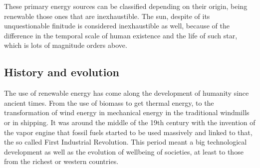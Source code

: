
These primary energy sources can be classified depending on their origin, being renewable those ones that are inexhaustible. The sun, despite of its unquestionable finitude is considered inexhaustible as well, because of the difference in the temporal scale of  human existence and the life of such star, which is lots of magnitude orders above.

\subsection{History and evolution}


The use of renewable energy has come along the development of humanity since ancient times. From the use of biomass to get thermal energy, to the transformation of wind energy in mechanical energy in the traditional windmills or in shipping. It was around the middle of the 19th century with the invention of the vapor engine that fossil fuels started to be used massively and linked to that, the so called First Industrial Revolution. This period meant a big technological development as well as the evolution of wellbeing of societies, at least to those from the richest or western countries.


